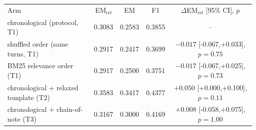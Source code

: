 \begin{tabular}{@{}lcccc@{}}
\toprule
Arm & EM$_{\text{rel}}$ & EM & F1 & $\Delta$EM$_{\text{rel}}$ [95\% CI], $p$ \\
chronological (protocol, T1) & 0.3083 & 0.2583 & 0.3855 & -- \\
shuffled order (same turns, T1) & 0.2917 & 0.2417 & 0.3699 & $-0.017$ [-0.067,+0.033], $p{=}0.75$ \\
BM25 relevance order (T1) & 0.2917 & 0.2500 & 0.3751 & $-0.017$ [-0.067,+0.025], $p{=}0.73$ \\
chronological + relaxed template (T2) & 0.3583 & 0.3417 & 0.4377 & $+0.050$ [+0.000,+0.100], $p{=}0.11$ \\
chronological + chain-of-note (T3) & 0.3167 & 0.3000 & 0.4169 & $+0.008$ [-0.058,+0.075], $p{=}1.00$ \\
\bottomrule
\end{tabular}